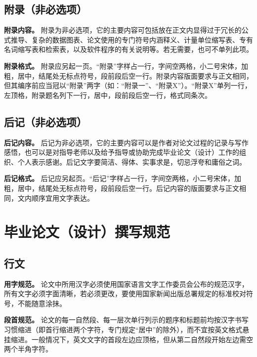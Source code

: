 \documentclass[doublesided]{Style/ucasthesis}%
\begin{document}
\hypertarget{section-21}{%
\subsection{附录（非必选项）}\label{section-21}}

\textbf{附录内容。} 附录为非必选项，它的主要内容可包括放在正文内显得过于冗长的公式推导、复杂的数据图表、论文使用的专门符号内涵释义、计量单位缩写表、专有名词缩写表和检索表，以及软件程序的有关说明等。若无需要，也可不单列此项。

\textbf{附录格式。} 附录应另起一页。``附录''字样占一行，字间空两格，小二号宋体，加粗，居中，结尾处无标点符号，段前段后空一行。附录内容版面要求与正文相同，但其编序前应当冠以``附录''两字（如：``附录一''、``附录X''）。``附录X''单列一行，左顶格，附录题名列下一行，居中，段前段后空一行，格式同条次。

\hypertarget{section-22}{%
\subsection{后记（非必选项）}\label{section-22}}

\textbf{后记内容。} 后记为非必选项，它的主要内容可以是作者对论文过程的记录与写作感悟，也可以是对指导老师以及给予指导或协助完成毕业论文（设计）工作的组织、个人表示感谢。后记文字要简洁、得体、实事求是，切忌浮夸和庸俗之词。

\textbf{后记格式。} 后记应另起页。``后记''字样占一行，字间空两格，小二号宋体，加粗，居中，结尾处无标点符号，段前段后空一行。后记内容的版面要求与正文相同，文内顺序宜用文字表达。

\hypertarget{section-23}{%
\section{毕业论文（设计）撰写规范}\label{section-23}}

\hypertarget{section-24}{%
\subsection{行文}\label{section-24}}

\textbf{用字规范。} 论文中所用汉字必须使用国家语言文字工作委员会公布的规范汉字，所有文字必须字面清晰，若必须更改，要使用国家新闻出版总署规定的标准校对符号，不能随意涂抺。

\textbf{段首规范。} 论文的每一自然段、每一层次单行列示的题序和标题前均按汉字书写习惯缩进（即首行缩进两个字符，专门规定``居中''的除外），而不宜按英文格式悬挂缩进。一般情况下，英文文字的首段左边应顶格，但从第二自然段开始左边需空两个半角字符。
\end{document}
